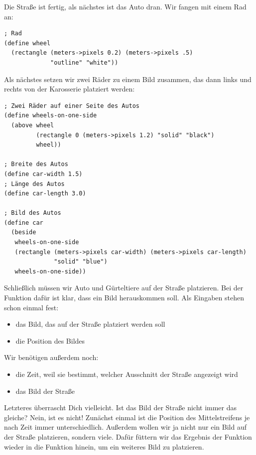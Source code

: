 Die Straße ist fertig, als nächstes ist das Auto dran.  Wir fangen mit
einem Rad an:
%
\begin{lstlisting}
; Rad
(define wheel
  (rectangle (meters->pixels 0.2) (meters->pixels .5)
             "outline" "white"))
\end{lstlisting}
%
Als nächstes setzen wir zwei Räder zu einem Bild zusammen, das dann
links und rechts von der Karosserie platziert werden:
%
\begin{lstlisting}
; Zwei Räder auf einer Seite des Autos
(define wheels-on-one-side
  (above wheel
         (rectangle 0 (meters->pixels 1.2) "solid" "black")
         wheel))

; Breite des Autos
(define car-width 1.5)
; Länge des Autos
(define car-length 3.0)
 
; Bild des Autos
(define car
  (beside
   wheels-on-one-side
   (rectangle (meters->pixels car-width) (meters->pixels car-length)
              "solid" "blue")
   wheels-on-one-side))
\end{lstlisting}
%
Schließlich müssen wir Auto und Gürteltiere auf der
Straße platzieren.  Bei der Funktion dafür ist klar, dass ein Bild
herauskommen soll.  Als Eingaben stehen schon einmal fest:
%
\begin{itemize}
\item das Bild, das auf der Straße platziert werden soll
\item die Position des Bildes
\end{itemize}
%
Wir benötigen außerdem noch:
%
\begin{itemize}
\item die Zeit, weil sie bestimmt, welcher Ausschnitt der Straße
  angezeigt wird
\item das Bild der Straße
\end{itemize}
%
Letzteres überrascht Dich vielleicht. Ist das Bild der Straße nicht
immer das gleiche?  Nein, ist es nicht!  Zunächst einmal ist die
Position des Mittelstreifens je nach Zeit immer unterschiedlich.
Außerdem wollen wir ja nicht nur ein Bild auf der Straße platzieren,
sondern viele.  Dafür füttern wir das Ergebnis der Funktion wieder in
die Funktion hinein, um ein weiteres Bild zu platzieren.

